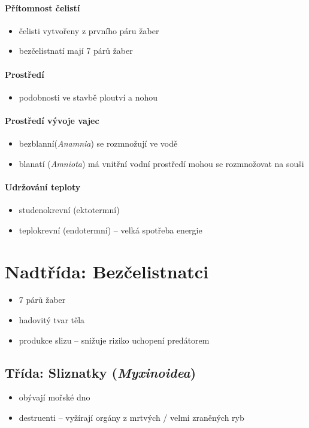 \paragraph{Přítomnost čelistí}
\begin{itemize}
\item čelisti vytvořeny z prvního páru žaber
\item bezčelistnatí mají 7 párů žaber
\end{itemize}

\paragraph{Prostředí}
\begin{itemize}
\item podobnosti ve stavbě ploutví a nohou
\end{itemize}

\paragraph{Prostředí vývoje vajec}
\begin{itemize}
\item bezblanní(\textit{Anamnia}) se rozmnožují ve vodě
\item blanatí (\textit{Amniota}) má vnitřní vodní prostředí \ra mohou se rozmnožovat na souši
\end{itemize}

\paragraph{Udržování teploty}
\begin{itemize}
\item studenokrevní (ektotermní)
\item teplokrevní (endotermní) -- velká spotřeba energie
\end{itemize}

\newpage
\section{Nadtřída: Bezčelistnatci}
\begin{itemize}
\item 7 párů žaber
\item hadovitý tvar těla
\item produkce slizu -- snižuje riziko uchopení predátorem
\end{itemize}

\subsection{Třída: Sliznatky (\textit{Myxinoidea})}
\begin{itemize}
\item obývají mořské dno
\item destruenti -- vyžírají orgány z mrtvých / velmi zraněných ryb
\end{itemize}

